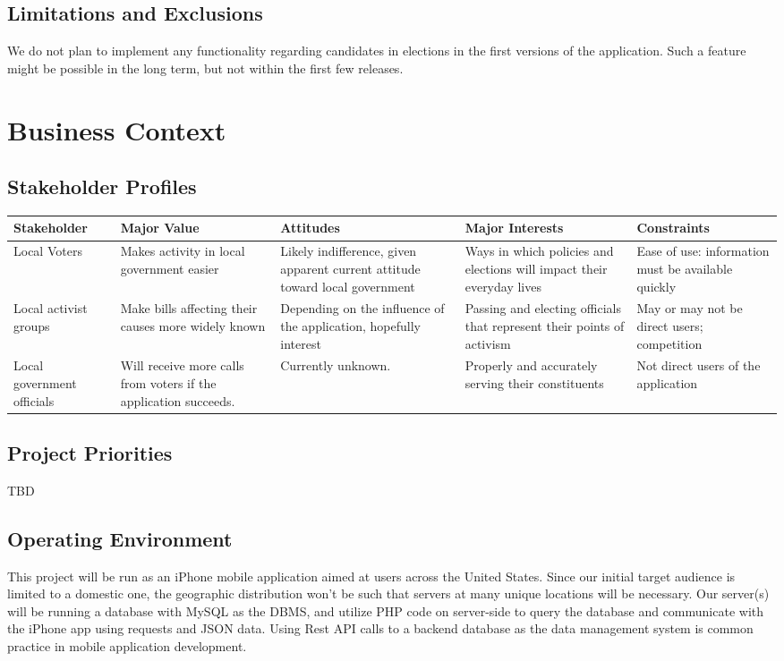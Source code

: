 \documentclass{article}
\begin{document}
\subsection{Limitations and Exclusions}
We do not plan to implement any functionality regarding candidates in
elections in the first versions of the application. Such a feature
might be possible in the long term, but not within the first few
releases.


\section{Business Context}
\subsection{Stakeholder Profiles}
\begin{adjustbox}{center,minipage=[c]{\paperwidth - 1in}}
  \begin{tabu}{lX[L]X[L]X[L]X[L]}
    \toprule
    Stakeholder & Major Value & Attitudes & Major Interests & Constraints\\
    \midrule
    Local Voters&
    Makes activity in local government easier&
    Likely indifference, given apparent current attitude toward local government&
    Ways in which policies and elections will impact their everyday lives&
    Ease of use: information must be available quickly\\

    Local activist groups&
    Make bills affecting their causes more widely known&
    Depending on the influence of the application, hopefully interest&
    Passing and electing officials that represent their points of activism&
    May or may not be direct users; competition\\

    Local government officials&
    Will receive more calls from voters if the application succeeds.&
    Currently unknown.&
    Properly and accurately serving their constituents&
    Not direct users of the application\\
    \bottomrule
  \end{tabu}
\end{adjustbox}

\subsection{Project Priorities}
TBD

\subsection{Operating Environment}
This project will be run as an iPhone mobile application aimed at
users across the United States. Since our initial target audience is
limited to a domestic one, the geographic distribution won’t be such
that servers at many unique locations will be necessary. Our server(s)
will be running a database with MySQL as the DBMS, and utilize PHP
code on server-side to query the database and communicate with the
iPhone app using requests and JSON data. Using Rest API calls to a
backend database as the data management system is common practice in
mobile application development.
\end{document}
